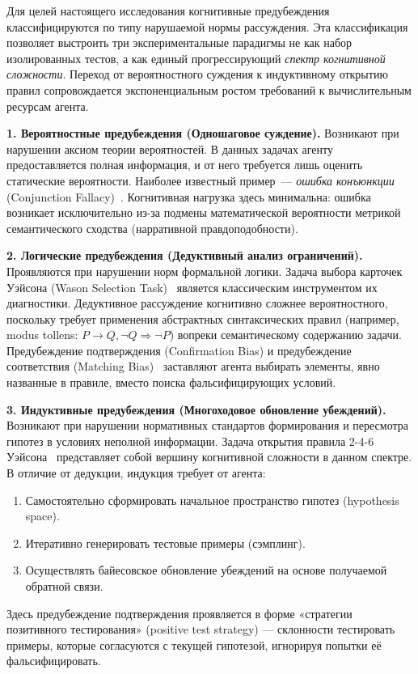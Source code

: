 Для целей настоящего исследования когнитивные предубеждения классифицируются по типу нарушаемой нормы рассуждения. Эта классификация позволяет выстроить три экспериментальные парадигмы не как набор изолированных тестов, а как единый прогрессирующий \textit{спектр когнитивной сложности}. Переход от вероятностного суждения к индуктивному открытию правил сопровождается экспоненциальным ростом требований к вычислительным ресурсам агента.

\textbf{1. Вероятностные предубеждения (Одношаговое суждение).}
Возникают при нарушении аксиом теории вероятностей. В данных задачах агенту предоставляется полная информация, и от него требуется лишь оценить статические вероятности. Наиболее известный пример~--- \textit{ошибка конъюнкции} (Conjunction Fallacy)~\cite{tversky1983extensional}. Когнитивная нагрузка здесь минимальна: ошибка возникает исключительно из-за подмены математической вероятности метрикой семантического сходства (нарративной правдоподобности).

\textbf{2. Логические предубеждения (Дедуктивный анализ ограничений).}
Проявляются при нарушении норм формальной логики. Задача выбора карточек Уэйсона (Wason Selection Task)~\cite{wason1966reasoning} является классическим инструментом их диагностики. Дедуктивное рассуждение когнитивно сложнее вероятностного, поскольку требует применения абстрактных синтаксических правил (например, modus tollens: $P \rightarrow Q, \lnot Q \Rightarrow \lnot P$) вопреки семантическому содержанию задачи. Предубеждение подтверждения (Confirmation Bias) и предубеждение соответствия (Matching Bias)~\cite{evans1998matching} заставляют агента выбирать элементы, явно названные в правиле, вместо поиска фальсифицирующих условий.

\textbf{3. Индуктивные предубеждения (Многоходовое обновление убеждений).}
Возникают при нарушении нормативных стандартов формирования и пересмотра гипотез в условиях неполной информации. Задача открытия правила 2-4-6 Уэйсона~\cite{wason1960failure} представляет собой вершину когнитивной сложности в данном спектре. В отличие от дедукции, индукция требует от агента:
\begin{enumerate}
    \item Самостоятельно сформировать начальное пространство гипотез (hypothesis space).
    \item Итеративно генерировать тестовые примеры (сэмплинг).
    \item Осуществлять байесовское обновление убеждений на основе получаемой обратной связи.
\end{enumerate}
Здесь предубеждение подтверждения проявляется в форме «стратегии позитивного тестирования» (positive test strategy) --- склонности тестировать примеры, которые согласуются с текущей гипотезой, игнорируя попытки её фальсифицировать.

